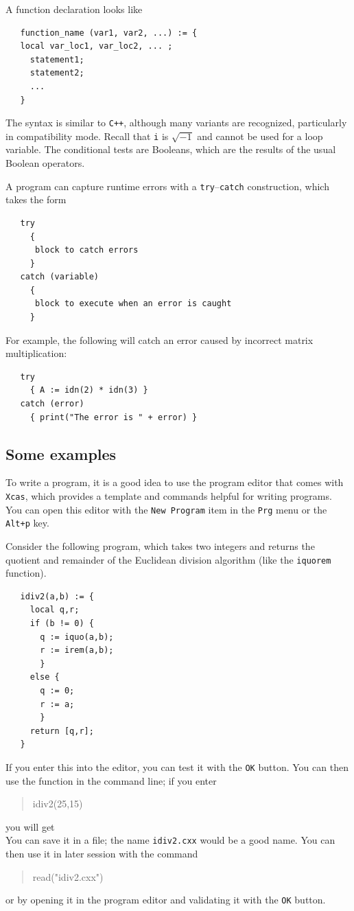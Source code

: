 \documentclass{article}
\newcommand{\xcasin}[1]
{\begin{quote}\ttfamily
#1
\end{quote}}
\newcommand{\xcasout}[1]
{\begin{equation*}
#1
\end{equation*}}
\begin{document}
A function declaration looks like
\begin{verbatim}
   function_name (var1, var2, ...) := {
   local var_loc1, var_loc2, ... ;
     statement1;
     statement2;
     ...
   }
\end{verbatim}
The syntax is similar to \texttt{C++}, although many variants are
recognized, particularly in compatibility mode.
Recall that \texttt{i} is $\sqrt{-1}$ and cannot be used for a loop
variable.  
The conditional tests are Booleans, which are the results of the usual
Boolean operators.

A program can capture runtime errors with a
\texttt{try}--\texttt{catch} construction, which takes the form
\begin{verbatim}
   try 
     {
      block to catch errors
     }
   catch (variable)
     {
      block to execute when an error is caught
     }
\end{verbatim}
For example, the following will catch an error caused by incorrect
matrix multiplication:
\begin{verbatim}
   try 
     { A := idn(2) * idn(3) }
   catch (error)
     { print("The error is " + error) }
\end{verbatim}

\subsection{Some examples}

To write a program, it is a good idea to use the program editor that
comes with \texttt{Xcas}, which provides a template and commands
helpful for writing programs.  You can open this editor with the
\texttt{New Program} item in the \texttt{Prg} menu or the
\texttt{Alt+p} key.

Consider the following program, which takes two integers and returns the
quotient and remainder of the Euclidean division algorithm (like the
\texttt{iquorem} function).
\begin{verbatim}
   idiv2(a,b) := {
     local q,r;
     if (b != 0) {
       q := iquo(a,b);
       r := irem(a,b);
       }
     else {
       q := 0;
       r := a;
       }
     return [q,r];
   }
\end{verbatim}
If you enter this into the editor, you can test it with the
\texttt{OK} button.  You can then use the function in the command
line; if you enter
\xcasin{idiv2(25,15)}
you will get
\xcasout{[1,10]}
You can save it in a file; the name \texttt{idiv2.cxx} would be a good
name.  You can then use it in later session with the command
\xcasin{read("idiv2.cxx")}
or by opening it in the program editor and validating it with the
\texttt{OK} button.
\end{document}

